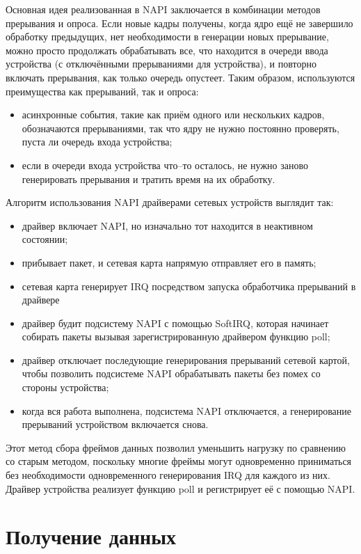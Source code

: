 Основная идея реализованная в NAPI заключается в комбинации методов прерывания и опроса. Если новые кадры получены, когда ядро ещё не завершило обработку предыдущих, нет необходимости в генерации новых прерывание, можно просто продолжать обрабатывать все, что находится в очереди ввода устройства (с отключёнными прерываниями для устройства), и повторно включать прерывания, как только очередь опустеет. Таким образом,  используются преимущества как прерываний, так и опроса:
\begin{itemize}[label=---]
	\item асинхронные события, такие как приём одного или нескольких кадров, обозначаются прерываниями, так что ядру не нужно постоянно проверять, пуста ли очередь входа устройства;
	\item если в очереди входа устройства что--то осталось, не нужно заново генерировать прерывания и тратить время на их обработку.
\end{itemize}

Алгоритм использования NAPI драйверами сетевых устройств выглядит так:
\begin{itemize}[label=---]
	\item драйвер включает NAPI, но изначально тот находится в неактивном состоянии;
	\item прибывает пакет, и сетевая карта напрямую отправляет его в память;
	\item сетевая карта генерирует IRQ посредством запуска обработчика прерываний в драйвере
	\item драйвер будит подсистему NAPI с помощью SoftIRQ, которая начинает собирать пакеты вызывая зарегистрированную драйвером функцию poll;
	\item драйвер отключает последующие генерирования прерываний сетевой картой, чтобы позволить подсистеме NAPI обрабатывать пакеты без помех со стороны устройства;
	\item когда вся работа выполнена, подсистема NAPI отключается, а генерирование прерываний устройством включается снова.
\end{itemize}

Этот метод сбора фреймов данных позволил уменьшить нагрузку по сравнению со старым методом, поскольку многие фреймы могут одновременно приниматься без необходимости одновременного генерирования IRQ для каждого из них. Драйвер устройства реализует функцию poll и регистрирует её с помощью NAPI.

\section{Получение данных}

